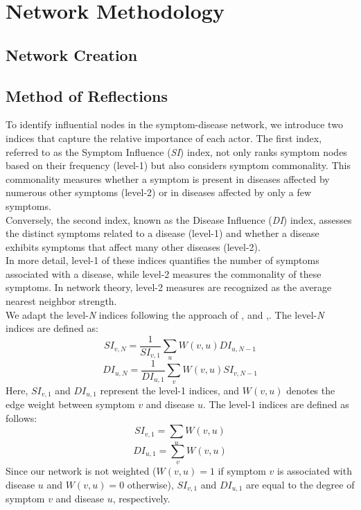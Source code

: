 \section{Network Methodology}

\subsection{Network Creation}


\subsection{Method of Reflections}

To identify influential nodes in the symptom-disease network, we introduce two indices that capture the relative importance of each actor.
The first index, referred to as the Symptom Influence (\textit{SI}) index, not only ranks symptom nodes based on their frequency (level-1)
but also considers symptom commonality.
This commonality measures whether a symptom is present in diseases affected by numerous other symptoms (level-2) or in diseases affected by only a few symptoms.\\
Conversely, the second index, known as the Disease Influence (\textit{DI}) index,
assesses the distinct symptoms related to a disease (level-1) and whether a disease exhibits symptoms that affect many other diseases (level-2).\\
In more detail, level-1 of these indices quantifies the number of symptoms associated with a disease,
while level-2 measures the commonality of these symptoms. In network theory, level-2 measures are recognized as the average nearest neighbor strength.\\
We adapt the level-\textit{N} indices following the approach of \citeauthor{Hidalgo_2007},\cite{Hidalgo_2007} and  \citeauthor{Hidalgo_2009},\cite{Hidalgo_2009}.
The level-\textit{N} indices are defined as:
\begin{equation}
    SI_{v, N} = \frac{1}{SI_{v, 1}} \sum_u W(v, u) DI_{u, N-1}
\end{equation}
\begin{equation}
    DI_{u, N} = \frac{1}{DI_{u, 1}} \sum_v W(v, u) SI_{v, N-1}
\end{equation}
\noindent
Here, $SI_{v, 1}$ and $DI_{u, 1}$ represent the level-1 indices, and $W(v,u)$ denotes the edge weight between symptom $v$ and disease $u$.
The level-1 indices are defined as follows:
\begin{equation}
    SI_{v, 1} = \sum_u W(v, u)
\end{equation}
\begin{equation}
    DI_{u, 1} = \sum_v W(v, u)
\end{equation}
\noindent
Since our network is not weighted ($W(v,u)=1$ if symptom $v$ is associated with disease $u$ and $W(v,u)=0$ otherwise),
$SI_{v,1}$ and $DI_{u,1}$ are equal to the degree of symptom $v$ and disease $u$, respectively.
